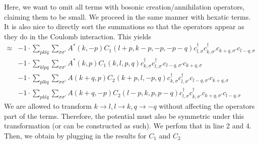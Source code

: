 Here, we want to omit all terms with bosonic creation/annihilation operators, claiming them to be small. We proceed in the same manner with hexatic terms.
It is also nice to directly sort the summations so that the operators appear as they do in the Coulomb interaction. This yields
\begin{align*}
	[\eta, H'] \approx 	&-1 \cdot \sum_{ p k l q } \sum_{ \sigma \sigma' } A^*( k, -p )  C_1( l+p, k-p, -p, -p-q )   c_{ l, \sigma }^\dagger  c_{ k, \sigma' }^\dagger  c_{ k+q, \sigma' } c_{ l-q, \sigma }  \\
	&-1 \cdot \sum_{ k l p q } \sum_{ \sigma \sigma' } A^*( k, p )  C_1( k, l, p, q )   c_{ k, \sigma }^\dagger  c_{ l, \sigma' }^\dagger  c_{ l-q, \sigma' } c_{ k+q, \sigma }  \\
	&-1 \cdot \sum_{ p l k q } \sum_{ \sigma \sigma' } A( k+q, p )  C_2( k+p, l, -p, q )   c_{ k, \sigma }^\dagger  c_{ l, \sigma' }^\dagger  c_{ l-q, \sigma' } c_{ k+q, \sigma }  \\
	&-1 \cdot \sum_{ p k l q } \sum_{ \sigma \sigma' } A( k+q, -p )  C_2( l-p, k, p, p-q )   c_{ l, \sigma }^\dagger  c_{ k, \sigma' }^\dagger  c_{ k+q, \sigma' } c_{ l-q, \sigma } 
\end{align*}
\newpage
We are allowed to transform $k \to l, l \to k, q \to -q$ without affecting the operators part of the terms. Therefore, the potential must also be symmetric under this transformation (or can be constructed as such). We perfom that in line 2 and 4. Then, we obtain by plugging in the results for $C_1$ and $C_2$
